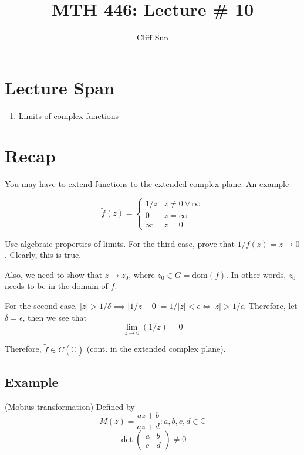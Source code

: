\documentclass{article}
\title{MTH 446: Lecture \# 10}
\author{Cliff Sun}
\newtheorem{one minute paper}[theorem]{One Minute Paper}
\begin{document}
\maketitle

\section*{Lecture Span}
\begin{enumerate}
    \item Limits of complex functions
\end{enumerate}
 
\section*{Recap}

You may have to extend functions to the extended complex plane. An example

\begin{equation}
    \tilde{f}(z) = \begin{cases}
        1/z & z \neq 0 \lor \infty \\
        0 & z = \infty \\
        \infty & z=0
    \end{cases}
\end{equation}

Use algebraic properties of limits. For the third case, prove that $1/f(z) = z \rightarrow 0$. Clearly, this is true.

Also, we need to show that $z \rightarrow z_0$, where $z_0 \in G = \text{dom}(f)$. In other words, $z_0$ needs to be in the domain of $f$. 

For the second case, $|z| > 1/\delta \implies |1/z - 0| = 1/|z| < \epsilon \iff |z| > 1/\epsilon$. Therefore, let $\delta = \epsilon$, then we see that 
\begin{equation}
    \lim_{z \rightarrow 0} (1/z) = 0
\end{equation}

Therefore, $\tilde{f} \in C(\overline{\mathbb{C}})$ (cont. in the extended complex plane). 

\subsection*{Example}

(Mobius transformation) Defined by 
\begin{equation}
    M(z) = \frac{az + b}{az + d}:  a,b,c,d \in \mathbb{C}
\end{equation}
\begin{equation}
    \det\begin{pmatrix}
        a & b \\
        c & d
    \end{pmatrix} \neq 0
\end{equation}
\end{document}
